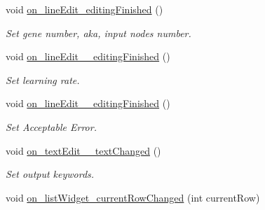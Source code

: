\begin{DoxyCompactItemize}
void \hyperlink{a00002_ab5da77a34a83e9794edda0d77d79bec0}{on\-\_\-line\-Edit\-\_\-editing\-Finished} ()
\begin{DoxyCompactList}\small\item\em Set gene number, aka, input nodes number. \end{DoxyCompactList}\item 
void \hyperlink{a00002_a6aff5c3694d19ebd2bd81010c239cf62}{on\-\_\-line\-Edit\-\_\-\_\-editing\-Finished} ()
\begin{DoxyCompactList}\small\item\em Set learning rate. \end{DoxyCompactList}\item 
void \hyperlink{a00002_a6bcefb22fdfb8fbd3146eab38a0023d7}{on\-\_\-line\-Edit\-\_\-\_\-editing\-Finished} ()
\begin{DoxyCompactList}\small\item\em Set Acceptable Error. \end{DoxyCompactList}\item 
void \hyperlink{a00002_a39f58394bb8e9691a7b32774114a910a}{on\-\_\-text\-Edit\-\_\-\_\-text\-Changed} ()
\begin{DoxyCompactList}\small\item\em Set output keywords. \end{DoxyCompactList}\item 
void \hyperlink{a00002_a073c74e8357311d12c523d73414ee265}{on\-\_\-list\-Widget\-\_\-current\-Row\-Changed} (int current\-Row)
\end{DoxyCompactItemize}
